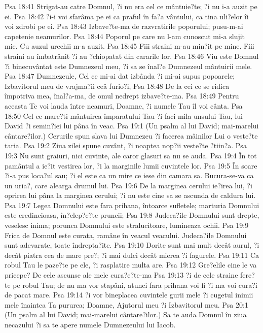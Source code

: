 Psa 18:41  Strigat-au catre Domnul, ?i nu era cel ce mântuie?te; ?i nu i-a auzit pe ei.
Psa 18:42  ?i-i voi sfarâma pe ei ca praful în fa?a vântului, ca tina uli?elor îi voi zdrobi pe ei.
Psa 18:43  Izbave?te-ma de razvratirile poporului; pusu-m-ai capetenie neamurilor.
Psa 18:44  Poporul pe care nu l-am cunoscut mi-a slujit mie. Cu auzul urechii m-a auzit.
Psa 18:45  Fiii straini m-au min?it pe mine. Fiii straini au îmbatrânit ?i au ?chiopatat din cararile lor.
Psa 18:46  Viu este Domnul ?i binecuvântat este Dumnezeul meu, ?i sa se înal?e Dumnezeul mântuirii mele.
Psa 18:47  Dumnezeule, Cel ce mi-ai dat izbânda ?i mi-ai supus popoarele; Izbavitorul meu de vrajma?ii ceâ furio?i,
Psa 18:48  De la cei ce se ridica împotriva mea, înal?a-ma, de omul nedrept izbave?te-ma.
Psa 18:49  Pentru aceasta Te voi lauda între neamuri, Doamne, ?i numele Tau îl voi cânta.
Psa 18:50  Cel ce mare?ti mântuirea împaratului Tau ?i faci mila unsului Tau, lui David ?i semin?iei lui pâna în veac.
Psa 19:1  (Un psalm al lui David; mai-marelui cântare?ilor.) Cerurile spun slava lui Dumnezeu ?i facerea mâinilor Lui o veste?te taria.
Psa 19:2  Ziua zilei spune cuvânt, ?i noaptea nop?ii veste?te ?tiin?a.
Psa 19:3  Nu sunt graiuri, nici cuvinte, ale caror glasuri sa nu se auda.
Psa 19:4  În tot pamântul a ie?it vestirea lor, ?i la marginile lumii cuvintele lor.
Psa 19:5  În soare ?i-a pus loca?ul sau; ?i el este ca un mire ce iese din camara sa. Bucura-se-va ca un uria?, care alearga drumul lui.
Psa 19:6  De la marginea cerului ie?irea lui, ?i oprirea lui pâna la marginea cerului; ?i nu este cine sa se ascunda de caldura lui.
Psa 19:7  Legea Domnului este fara prihana, întoarce sufletele; marturia Domnului este credincioasa, în?elep?e?te pruncii;
Psa 19:8  Judeca?ile Domnului sunt drepte, veselesc inima; porunca Domnului este stralucitoare, lumineaza ochii.
Psa 19:9  Frica de Domnul este curata, ramâne în veacul veacului. Judeca?ile Domnului sunt adevarate, toate îndrepta?ite.
Psa 19:10  Dorite sunt mai mult decât aurul, ?i decât piatra cea de mare pre?; ?i mai dulci decât mierea ?i fagurele.
Psa 19:11  Ca robul Tau le paze?te pe ele, ?i rasplatire multa are.
Psa 19:12  Gre?elile cine le va pricepe? De cele ascunse ale mele cura?e?te-ma
Psa 19:13  ?i de cele straine fere?te pe robul Tau; de nu ma vor stapâni, atunci fara prihana voi fi ?i ma voi cura?i de pacat mare.
Psa 19:14  ?i vor bineplacea cuvintele gurii mele ?i cugetul inimii mele înaintea Ta pururea; Doamne, Ajutorul meu ?i Izbavitorul meu.
Psa 20:1  (Un psalm al lui David; mai-marelui cântare?ilor.) Sa te auda Domnul în ziua necazului ?i sa te apere numele Dumnezeului lui Iacob.
